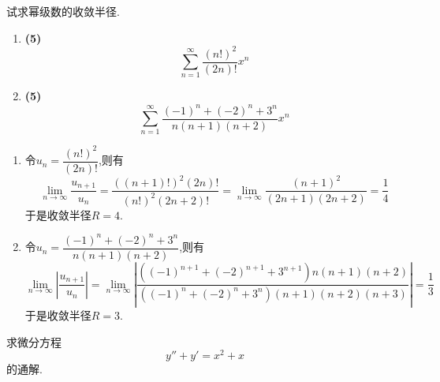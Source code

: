 \documentclass{ctexart}
\begin{document}
\begin{problem}[2.(10\songti{分})]
    试求幂级数的收敛半径.
    \begin{enumerate}[label=\tbf{(\arabic*)},topsep=0pt,parsep=0pt,itemsep=0pt,partopsep=0pt]
        \item \textbf{(5)}
            \[\sum_{n=1}^{\infty}\dfrac{\left(n!\right)^2}{(2n)!}x^n\]
        \item \textbf{(5)}
            \[\sum_{n=1}^{\infty}\dfrac{(-1)^n+(-2)^n+3^n}{n(n+1)(n+2)}x^n\]

    \end{enumerate}

\end{problem}
\begin{solution}
    \begin{enumerate}[label=\tbf{(\arabic*)},topsep=0pt,parsep=0pt,itemsep=0pt,partopsep=0pt]
        \item 令$u_n=\dfrac{\left(n!\right)^2}{(2n)!}$,则有
            \[\lim_{n\to\infty}\dfrac{u_{n+1}}{u_n}=\dfrac{\left((n+1)!\right)^2(2n)!}{\left(n!\right)^2(2n+2)!}
            =\lim_{n\to\infty}\dfrac{(n+1)^2}{(2n+1)(2n+2)}=\dfrac14\]
            于是收敛半径$R=4$.
        \item 令$u_n=\dfrac{(-1)^n+(-2)^n+3^n}{n(n+1)(n+2)}$,则有
            \[\lim_{n\to\infty}\left|\dfrac{u_{n+1}}{u_n}\right|
            =\lim_{n\to\infty}\left|\dfrac{\left((-1)^{n+1}+(-2)^{n+1}+3^{n+1}\right)n(n+1)(n+2)}{\left((-1)^n+(-2)^n+3^n\right)(n+1)(n+2)(n+3)}\right|=\dfrac13\]
            于是收敛半径$R=3$.

    \end{enumerate}
\end{solution}
\begin{problem}[3.(10\songti{分})]
    求微分方程
    \[y''+y'=x^2+x\]
    的通解.

\end{problem}
\end{document}
